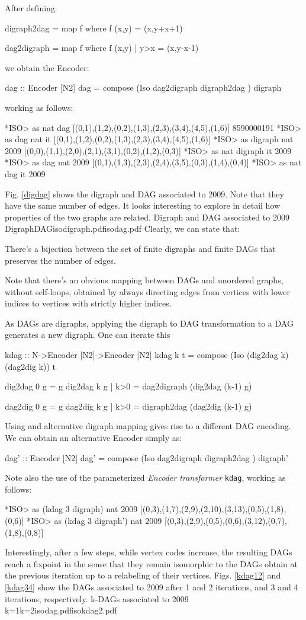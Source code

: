 \documentclass[]{INCLUDES/llncs}
\begin{document}
After defining:
\begin{code}
digraph2dag = map f where f (x,y) = (x,y+x+1)

dag2digraph = map f where f (x,y) | y>x = (x,y-x-1)
\end{code}
we obtain the Encoder:
\begin{code}
dag :: Encoder [N2]
dag = compose (Iso dag2digraph digraph2dag ) digraph
\end{code}
working as follows:
\begin{codex}
*ISO> as nat dag [(0,1),(1,2),(0,2),(1,3),(2,3),(3,4),(4,5),(1,6)]
8590000191
*ISO> as dag nat it
[(0,1),(1,2),(0,2),(1,3),(2,3),(3,4),(4,5),(1,6)]
*ISO> as digraph nat 2009
[(0,0),(1,1),(2,0),(2,1),(3,1),(0,2),(1,2),(0,3)]
*ISO> as nat digraph it
2009
*ISO> as dag nat 2009
[(0,1),(1,3),(2,3),(2,4),(3,5),(0,3),(1,4),(0,4)]
*ISO> as nat dag it
2009
\end{codex}
Fig. \ref{digdag} shows the digraph and DAG associated to 2009. Note that they
have the same number of edges. It looks interesting to explore in detail how
properties of the two graphs are related.
{Digraph and DAG associated to 2009}
{Digraph}{DAG}{isodigraph.pdf}{isodag.pdf}
Clearly, we can state that:
\begin{prop}
There's a bijection between the set of finite digraphs and finite DAGs that
preserves the number of edges.
\end{prop}
Note that there's an obvious mapping between DAGs and unordered graphs,
without self-loops, obtained by always directing edges from vertices with lower
indices to vertices with strictly higher indices.

As DAGs are digraphs, applying the digraph to DAG transformation
to a DAG generates a new digraph. One can iterate this 
\begin{code}
kdag :: N->Encoder [N2]->Encoder [N2]
kdag k t = compose (Iso (dig2dag k) (dag2dig k)) t

dig2dag 0 g = g
dig2dag k g | k>0 = dag2digraph (dig2dag (k-1) g)

dag2dig 0 g = g
dag2dig k g | k>0 = digraph2dag (dag2dig (k-1) g)
\end{code}
Using and alternative digraph mapping gives rise to a
different DAG encoding. We can obtain an alternative Encoder simply as:
\begin{code}
dag' :: Encoder [N2]
dag' = compose (Iso dag2digraph digraph2dag ) digraph'
\end{code}
Note also the use of the parameterized {\em Encoder transformer} {\tt kdag},
working as follows:
\begin{codex}
*ISO> as (kdag 3 digraph) nat 2009
[(0,3),(1,7),(2,9),(2,10),(3,13),(0,5),(1,8),(0,6)]
*ISO> as (kdag 3 digraph') nat 2009
[(0,3),(2,9),(0,5),(0,6),(3,12),(0,7),(1,8),(0,8)]
\end{codex}
Interestingly, after a few steps, while vertex codes increase, the resulting
DAGs reach a fixpoint in the sense that they remain isomorphic to the DAGs
obtain at the previous iteration up to a relabeling of their vertices.
Figs. \ref{kdag12} and \ref{kdag34} show the DAGs associated to 2009 after 1
and 2 iterations, and 3 and 4 iterations, respectively.
{k-DAGs associated to 2009}
{k=1}{k=2}{isodag.pdf}{isokdag2.pdf}
\end{document}

